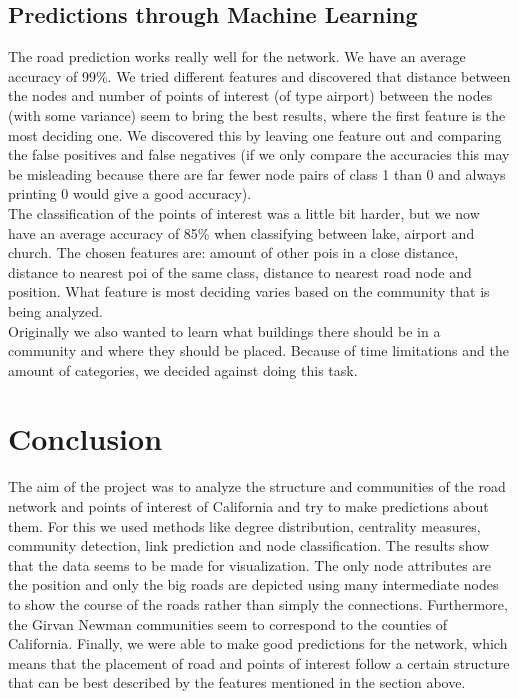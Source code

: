 \documentclass[11pt]{article}
\begin{document}
\subsection{Predictions through Machine Learning}
The road prediction works really well for the network. We have an average accuracy of 99\%. We tried different features and discovered that distance between the nodes and number of points of interest (of type airport) between the nodes (with some variance) seem to bring the best results, where the first feature is the most deciding one. We discovered this by leaving one feature out and comparing the false positives and false negatives (if we only compare the accuracies this may be misleading because there are far fewer node pairs of class 1 than 0 and always printing 0 would give a good accuracy). \\
The classification of the points of interest was a little bit harder, but we now have an average accuracy of 85\% when classifying between lake, airport and church. The chosen features are: amount of other pois in a close distance, distance to nearest poi of the same class, distance to nearest road node and position. What feature is most deciding varies based on the community that is being analyzed. \\
Originally we also wanted to learn what buildings there should be in a community and where they should be placed. Because of time limitations and the amount of categories, we decided against doing this task. 

\section{Conclusion}
The aim of the project was to analyze the structure and communities of the road network and points of interest of California and try to make predictions about them. For this we used methods like degree distribution, centrality measures, community detection, link prediction and node classification.
The results show that the data seems to be made for visualization. The only node attributes are the position and only the big roads are depicted using many intermediate nodes to show the course of the roads rather than simply the connections. Furthermore, the Girvan Newman communities seem to correspond to the counties of California. Finally, we were able to make good predictions for the network, which means that the placement of road and points of interest follow a certain structure that can be best described by the features mentioned in the section above.
\end{document}
